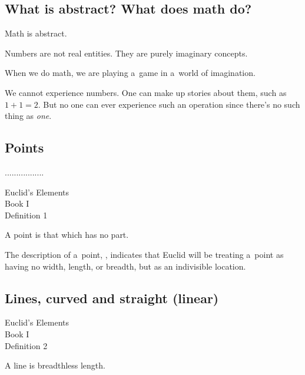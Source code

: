\subsection{What is abstract? What does math do?}

Math is abstract.

Numbers are not real entities.
They are purely imaginary concepts.

When we do math, we are playing a~game in a~world of imagination.

We cannot experience numbers.
One can make up stories about them, such as ${1+1=2}$.
But no one can ever experience such an operation since there’s no such thing as \emph{one}.

\subsection{Points}

.................

{\small
\setlength{\parindent}{0pt}

\begin{leftverticalbar}%

Euclid’s Elements\\
Book I\\
Definition 1

A point is that which has no part.

\end{leftverticalbar}
\par}

The description of a~point, , indicates that Euclid will be treating a~point as having no width, length, or breadth, but as an indivisible location.

\subsection{Lines, curved and straight (linear)}

{\small
\setlength{\parindent}{0pt}

\begin{leftverticalbar}%

Euclid’s Elements\\
Book I\\
Definition 2

A line is breadthless length.

\end{leftverticalbar}
\par}

